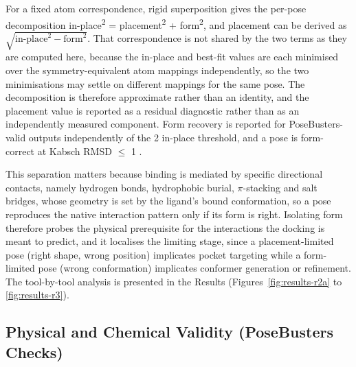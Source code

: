 For a fixed atom correspondence, rigid superposition gives the per-pose decomposition in-place\textsuperscript{2} = placement\textsuperscript{2} + form\textsuperscript{2}, and placement can be derived as \(\sqrt{\text{in-place}^{2}-\text{form}^{2}}\). That correspondence is not shared by the two terms as they are computed here, because the in-place and best-fit values are each minimised over the symmetry-equivalent atom mappings independently, so the two minimisations may settle on different mappings for the same pose. The decomposition is therefore approximate rather than an identity, and the placement value is reported as a residual diagnostic rather than as an independently measured component. Form recovery is reported for PoseBusters-valid outputs independently of the 2 \angstrom{} in-place threshold, and a pose is form-correct at Kabsch RMSD \ensuremath{\leq} 1 \angstrom{}.

This separation matters because binding is mediated by specific directional contacts, namely hydrogen bonds, hydrophobic burial, \ensuremath{\pi}-stacking and salt bridges, whose geometry is set by the ligand's bound conformation, so a pose reproduces the native interaction pattern only if its form is right. Isolating form therefore probes the physical prerequisite for the interactions the docking is meant to predict, and it localises the limiting stage, since a placement-limited pose (right shape, wrong position) implicates pocket targeting while a form-limited pose (wrong conformation) implicates conformer generation or refinement. The tool-by-tool analysis is presented in the Results (Figures~\ref{fig:results-r2a} to \ref{fig:results-r3}).

\hypertarget{physical-and-chemical-validity-posebusters-checks}{%
\subsection{Physical and Chemical Validity (PoseBusters Checks)}\label{physical-and-chemical-validity-posebusters-checks}}

